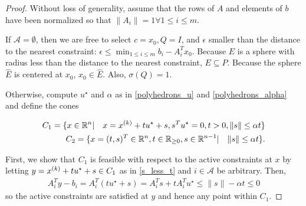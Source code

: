 \begin{proof}

Without loss of generality, assume that the rows of $A$ and elements of $b$ have been normalized so that $\|A_i\| = 1 \forall 1 \le i \le m$.

If $\mathcal A = \emptyset$, then we are free to select $c = x_0, Q = I$, and $ \epsilon$ smaller than the distance to the nearest constraint:
$\epsilon \le  \min_{1 \le i \le m} b_i - A_i^Tx_0$. Because $E$ is a sphere with radius less than the distance to the nearest constraint, $E \subseteq P$.
Because the sphere $\hat E$ is centered at $x_0$, $x_0 \in \hat E$. Also, $\sigma(Q) = 1$.

Otherwise, compute $u^{\star}$ and $\alpha$ as in \cref{polyhedrons_u} and \cref{polyhedrons_alpha} and define the cones

\begin{align}
C_1 = \{x \in \mathbb R^n | \quad x = {x^{(k)}} + t u^{\star}+ s, s^Tu^{\star} = 0, t > 0, \|s\| \le \alpha t\} \label{s_less_t} \\
C_2 = \{x = (t, s)^T \in \mathbb R^n, t \in \mathbb R_{\ge 0}, s \in \mathbb R^{n-1} |\quad \|s\| \le \alpha t \}.
\end{align}

First, we show that $C_1$ is feasible with respect to the active constraints at $x$
by letting $y = {x^{(k)}} + tu^{\star} + s\in C_1$ as in \ref{s_less_t} and $i \in \mathcal A$ be arbitrary.
Then,
\begin{align*}
A_{i}^Ty - b_{i} = A_{i}^T(tu^{\star} + s) = A_{i}^Ts + t A_{i}^Tu^{\star} \le \|s\| - \alpha t \le 0
\end{align*}
so the active constraints are satisfied at $y$ and hence any point within $C_1$.


\end{proof}

